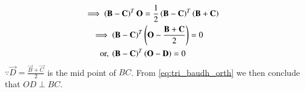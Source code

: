 \begin{enumerate}[label=\arabic*.,ref=\thesubsection.\theenumi]
\begin{align}
\\
\implies \left(\mathbf{B}-\mathbf{C}\right)^T\mathbf{O} &=   \frac{1}{2}\left(\mathbf{B}- \mathbf{C}\right)^T\left(\mathbf{B}+ \mathbf{C}\right)
\\
\implies \left(\mathbf{B}-\mathbf{C}\right)^T&\left(\mathbf{O} - \frac{\mathbf{B}+\mathbf{C}}{2}\right) = 0
\\
\text{or, } \left(\mathbf{B}-\mathbf{C}\right)^T&\left(\mathbf{O} - \mathbf{D}\right) = 0
\end{align}
%
$\because \vec{D} = \frac{\vec{B}+\vec{C}}{2}$ is the mid point of $BC$.  From \eqref{eq:tri_baudh_orth} we then conclude that $OD \perp BC$.
%

\end{enumerate}


